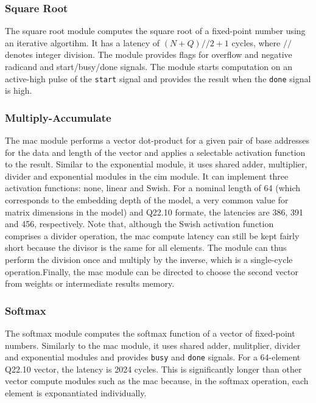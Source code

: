 \subsubsection{Square Root}
The square root module computes the square root of a fixed-point number using an iterative algortihm. It has a latency of $(N+Q)//2+1$ cycles, where $//$ denotes integer division. The module provides flags for overflow and
negative radicand and start/busy/done signals. The module starts computation on an active-high pulse of the \texttt{start} signal and provides the result when the \texttt{done} signal is high.

\subsubsection{Multiply-Accumulate}
The \ac{mac} module performs a vector dot-product for a given pair of base addresses for the data and length of the vector and applies a selectable activation function to the result. Similar to the exponential module, it
uses shared adder, multiplier, divider and exponential modules in the \ac{cim} module. It can implement three activation functions: none, linear and Swish. For a nominal length of 64 (which corresponds to the embedding
depth of the model, a very common value for matrix dimensions in the model) and Q22.10 formate, the latencies are 386, 391 and 456, respectively. Note that, although the Swish activation function comprises a divider operation,
the \ac{mac} compute latency can still be kept fairly short because the divisor is the same for all elements. The module can thus perform the division once and multiply by the inverse, which is a single-cycle operation.Finally,
the \ac{mac} module can be directed to choose the second vector from weights or intermediate results memory.

\subsubsection{Softmax}
The softmax module computes the softmax function of a vector of fixed-point numbers. Similarly to the \ac{mac} module, it uses shared adder, mulitplier, divider and exponential modules and provides \texttt{busy} and
\texttt{done} signals. For a 64-element Q22.10 vector, the latency is 2024 cycles. This is significantly longer than other vector compute modules such as the \ac{mac} because, in the softmax operation, each element is exponantiated
individually.

